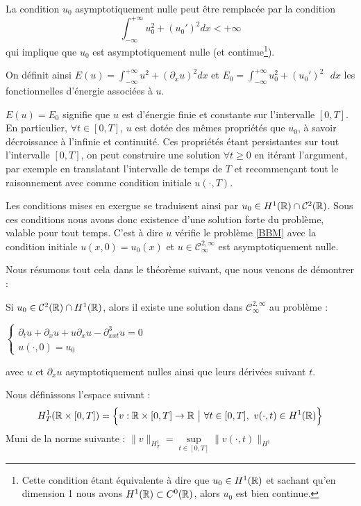 La condition $u_0$ asymptotiquement nulle peut être remplacée par la condition 
$$\int_{-\infty}^{+\infty} u_0^2 + (u_0')^2 dx < +\infty$$
qui implique que $u_0$ est asymptotiquement nulle (et continue\footnote{Cette condition étant équivalente à dire que $u_0 \in H^1(\mathbb{R})$ et sachant qu'en dimension 1 nous avons $H^1(\mathbb{R}) \subset C^0(\mathbb{R})$, alors $u_0$ est bien continue.}).


On définit ainsi $E(u) = \int_{-\infty}^{+\infty} u^2 + (\partial_x u)^2 dx$ et $E_0 =\int_{-\infty}^{+\infty} u_0^2 + (u_0')^2 \text{ } dx $ les fonctionnelles d'énergie associées à $u$.


$E(u) = E_0$  signifie que $u$ est d'énergie finie et constante sur l'intervalle $[0,T]$. En particulier, $\forall t \in [0,T]$, $u$ est dotée des mêmes propriétés que $u_0$,
à savoir décroissance à l'infinie et continuité. Ces propriétés étant persistantes sur tout l'intervalle $[0,T]$, on peut construire une solution $\forall t \geq 0$ en itérant l'argument, par exemple en
translatant l'intervalle de temps de $T$ et recommençant tout le raisonnement avec comme condition initiale $u(\cdot,T)$.

Les conditions mises en exergue se traduisent ainsi par $u_0 \in H^1(\mathbb{R}) \cap \mathcal{C}^2(\mathbb{R})$. Sous ces conditions nous avons donc existence d'une solution forte du problème, valable pour tout temps. 
C'est à dire $u$ vérifie le problème \ref{BBM} avec la condition initiale $u(x,0) = u_0(x)$ et $u \in \mathcal{C}_{\infty}^{2,\infty}$ est asymptotiquement nulle.

Nous résumons tout cela dans le théorème suivant, que nous venons de démontrer :

\begin{theorembox}
\begin{theorem}
    Si $u_0 \in \mathcal{C}^2(\mathbb{R}) \cap H^1(\mathbb{R})$, alors il existe une solution dans $\mathcal{C}_{\infty}^{2,\infty}$ au problème :
    
    $\begin{cases}
        \partial_t u + \partial_x u + u\partial_x u - \partial_{xxt}^3 u = 0 \\
        u(\cdot,0) = u_0
    \end{cases}$

    avec $u$ et $\partial_xu$ asymptotiquement nulles ainsi que leurs dérivées suivant $t$.
\end{theorem}
\end{theorembox}

Nous définissons l'espace suivant :
$$H^1_T(\mathbb{R} \times [0,T]) = \Big\{ v: \mathbb{R} \times [0,T] \to \mathbb{R} \ \big| \ \forall t \in [0,T], \ v(\cdot, t) \in H^1(\mathbb{R}) \Big\} $$
Muni de la norme suivante : $\|v\|_{H^1_T} = \underset{t \in [0,T]}{\sup}\|v (\cdot, t) \|_{H^1}$

